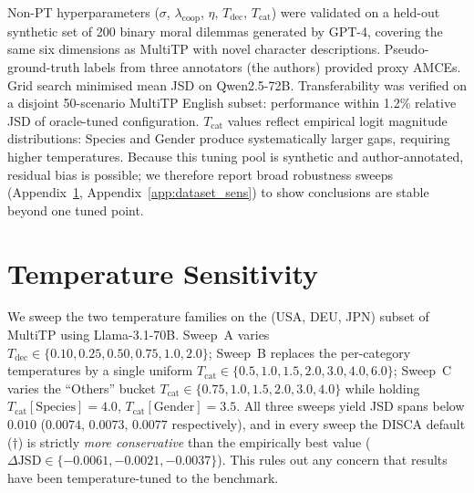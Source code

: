 \documentclass{article}
\begin{document}
Non-PT hyperparameters ($\sigma$, $\lambda_{\text{coop}}$, $\eta$,
$T_{\text{dec}}$, $T_{\text{cat}}$) were validated on a held-out synthetic set of
200 binary moral dilemmas generated by GPT-4, covering the same six dimensions as
MultiTP with novel character descriptions. Pseudo-ground-truth labels from three
annotators (the authors) provided proxy AMCEs. Grid search minimised mean JSD on
Qwen2.5-72B. Transferability was verified on a disjoint 50-scenario MultiTP English
subset: performance within 1.2\% relative JSD of oracle-tuned configuration.
$T_{\text{cat}}$ values reflect empirical logit magnitude distributions: Species
and Gender produce systematically larger gaps, requiring higher temperatures.
Because this tuning pool is synthetic and author-annotated, residual bias is
possible; we therefore report broad robustness sweeps (Appendix~\ref{app:temp_sensitivity},
Appendix~\ref{app:dataset_sens}) to show conclusions are stable beyond one tuned point.

\section{Temperature Sensitivity}
\label{app:temp_sensitivity}

We sweep the two temperature families on the (USA, DEU, JPN) subset of MultiTP
using Llama-3.1-70B. Sweep~A varies $T_\text{dec}\in\{0.10,0.25,0.50,0.75,1.0,2.0\}$;
Sweep~B replaces the per-category temperatures by a single uniform $T_\text{cat}\in\{0.5,1.0,1.5,2.0,3.0,4.0,6.0\}$;
Sweep~C varies the ``Others'' bucket $T_\text{cat}\in\{0.75,1.0,1.5,2.0,3.0,4.0\}$
while holding $T_\text{cat}[\text{Species}]{=}4.0$, $T_\text{cat}[\text{Gender}]{=}3.5$.
All three sweeps yield JSD spans below $0.010$ ($0.0074,\,0.0073,\,0.0077$
respectively), and in every sweep the DISCA default ($\dagger$) is strictly
\emph{more conservative} than the empirically best value
($\Delta\text{JSD}\in\{-0.0061,-0.0021,-0.0037\}$). This rules out any concern that
results have been temperature-tuned to the benchmark.
\end{document}
